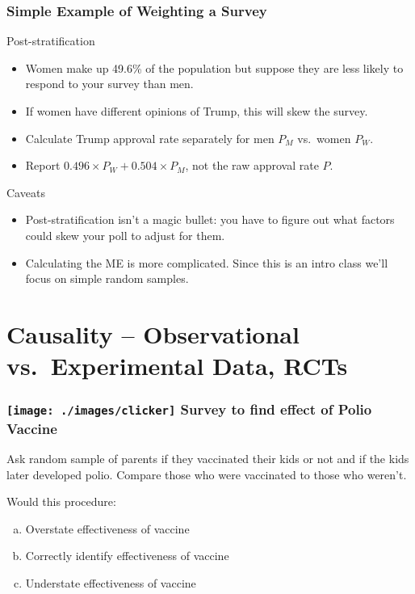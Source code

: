 \begin{frame}
  \frametitle{Simple Example of Weighting a Survey}

  \footnotesize
  \begin{block}{Post-stratification}
    \begin{itemize}
  \item Women make up 49.6\% of the population but suppose they are less likely to respond to your survey than men. 
  \item If women have different opinions of Trump, this will skew the survey.
  \item Calculate Trump approval rate separately for men $P_M$ vs.\ women $P_W$.
  \item Report $0.496 \times P_W +  0.504 \times P_M$, not the raw approval rate $P$.
\end{itemize}
  \end{block}

  \pause
    
  \begin{alertblock}{Caveats}
    \begin{itemize}
      \item Post-stratification isn't a magic bullet: you have to figure out what factors could skew your poll to adjust for them.
      \item Calculating the ME is more complicated. Since this is an intro class we'll focus on simple random samples.
    \end{itemize}
  \end{alertblock}

\end{frame}

\section{Causality -- Observational vs.\ Experimental Data, RCTs}
\begin{frame}
\frametitle{\texttt{[image: ./images/clicker]} \hfill Survey to find effect of Polio Vaccine}
Ask random sample of parents if they vaccinated their kids or not and if the kids later developed polio. Compare those who were vaccinated to those who weren't.

\vspace{1em}


Would this procedure:
	\begin{enumerate}[(a)]
		\item Overstate effectiveness of vaccine
		\item Correctly identify effectiveness of vaccine
		\item Understate effectiveness of vaccine
	\end{enumerate}

\end{frame}

